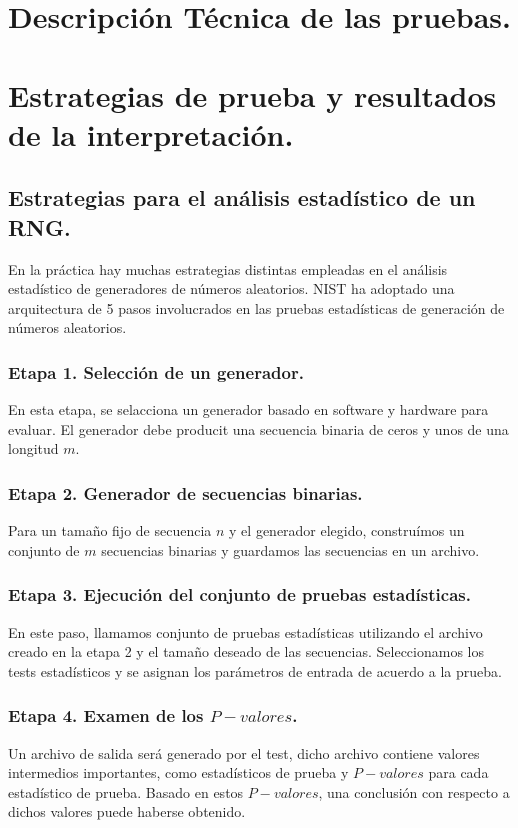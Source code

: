 \documentclass{llncs}
\theoremstyle{plane}
\begin{document}
\section{Descripción Técnica de las pruebas.}
\section{Estrategias de prueba y resultados de la interpretación.}

\subsection{Estrategias para el análisis estadístico de un RNG.}
En la práctica hay muchas estrategias distintas empleadas en el análisis estadístico de generadores de números aleatorios. NIST ha adoptado una arquitectura de 5 pasos involucrados en las pruebas estadísticas de generación de números aleatorios.

\subsubsection{Etapa 1. Selección de un generador.}
En esta etapa, se selacciona un generador basado en software y hardware para evaluar. El generador debe producit una secuencia binaria de ceros y unos de una longitud $m$. 


\subsubsection{Etapa 2. Generador de secuencias binarias.}
Para un tamaño fijo de secuencia $n$ y el generador elegido, construímos un conjunto de $m$ secuencias binarias y guardamos las secuencias en un archivo.

\subsubsection{Etapa 3. Ejecución del conjunto de pruebas estadísticas.}
En este paso, llamamos conjunto de pruebas estadísticas utilizando el archivo creado en la etapa 2 y el tamaño deseado de las secuencias. Seleccionamos los tests estadísticos y se asignan los parámetros de entrada de acuerdo a la prueba. 

\subsubsection{Etapa 4. Examen de los $P-valores$.}
Un archivo de salida será generado por el test, dicho archivo contiene valores intermedios importantes, como estadísticos de prueba y $P-valores$ para cada estadístico de prueba. Basado en estos $P-valores$, una conclusión con respecto a dichos valores puede haberse obtenido.
\end{document}
